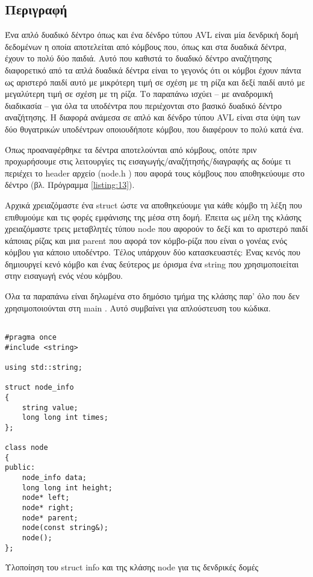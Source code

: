 \subsection*{Περιγραφή}

Ένα απλό δυαδικό δέντρο όπως και ένα δένδρο τύπου \en AVL \gr  είναι μία δενδρική δομή δεδομένων η οποία αποτελείται από κόμβους που, όπως και στα δυαδικά δέντρα, έχουν το πολύ δύο παιδιά. Αυτό που καθιστά το δυαδικό δέντρο αναζήτησης διαφορετικό από τα απλά δυαδικά δέντρα είναι το γεγονός ότι οι κόμβοι έχουν πάντα ως αριστερό παιδί αυτό με μικρότερη τιμή σε σχέση με τη ρίζα και δεξί παιδί αυτό με μεγαλύτερη τιμή σε σχέση με τη ρίζα. Το παραπάνω ισχύει -- με αναδρομική διαδικασία -- για όλα τα υποδέντρα που περιέχονται στο βασικό δυαδικό δέντρο αναζήτησης. Η διαφορά ανάμεσα σε απλό και δένδρο τύπου \en AVL \gr είναι στα ύψη των δύο θυγατρικών υποδέντρων οποιουδήποτε κόμβου, που διαφέρουν το πολύ κατά ένα.

Όπως προαναφέρθηκε τα δέντρα αποτελούνται από κόμβους, οπότε πριν προχωρήσουμε στις λειτουργίες τις εισαγωγής/αναζήτησής/διαγραφής ας δούμε τι περιέχει το \en header \gr  αρχείο (\en node.h \gr) που αφορά τους κόμβους που αποθηκεύουμε στο δέντρο (βλ. Πρόγραμμα \ref{listing:13}).

Αρχικά χρειαζόμαστε ένα \en struct \gr ώστε να αποθηκεύουμε για κάθε κόμβο τη λέξη που επιθυμούμε και τις φορές εμφάνισης της μέσα στη δομή. Έπειτα ως μέλη της κλάσης χρειαζόμαστε τρεις μεταβλητές τύπου \en node \gr που αφορούν το δεξί  και το αριστερό παιδί κάποιας ρίζας και μια \en parent \gr που αφορά τον κόμβο-ρίζα που είναι ο γονέας ενός κόμβου για κάποιο υποδέντρο. Τέλος υπάρχουν δύο κατασκευαστές: Ένας κενός που δημιουργεί κενό κόμβο και ένας δεύτερος με όρισμα ένα \en string \gr που χρησιμοποιείται στην εισαγωγή ενός νέου κόμβου. 

Όλα τα παραπάνω είναι δηλωμένα στο δημόσιο τμήμα της κλάσης παρ’ όλο που δεν χρησιμοποιούνται στη \en main \gr. Αυτό συμβαίνει για απλούστευση του κώδικα.

\en
\begin{listing}[ht]
\begin{verbatim}

#pragma once
#include <string>

using std::string;

struct node_info
{
    string value;
    long long int times;
};

class node
{
public:
    node_info data;
    long long int height;
    node* left;
    node* right;
    node* parent;
    node(const string&);
    node();
};

\end{verbatim}
\caption{Υλοποίηση του struct info και της κλάσης node για τις δενδρικές δομές}
\label{listing:13}
\end{listing}
\gr


